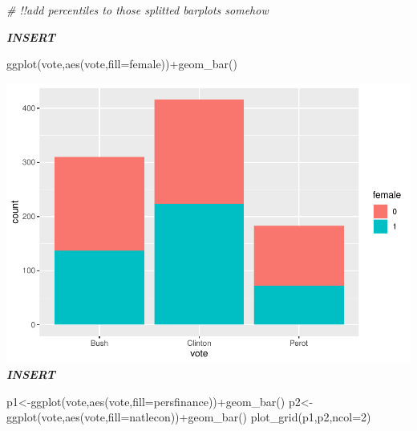\documentclass[
]{article}
\newenvironment{Shaded}{\begin{snugshade}}{\end{snugshade}}
\newcommand{\AttributeTok}[1]{\textcolor[rgb]{0.77,0.63,0.00}{#1}}
\newcommand{\CommentTok}[1]{\textcolor[rgb]{0.56,0.35,0.01}{\textit{#1}}}
\newcommand{\DecValTok}[1]{\textcolor[rgb]{0.00,0.00,0.81}{#1}}
\newcommand{\FunctionTok}[1]{\textcolor[rgb]{0.00,0.00,0.00}{#1}}
\newcommand{\NormalTok}[1]{#1}
\newcommand{\OtherTok}[1]{\textcolor[rgb]{0.56,0.35,0.01}{#1}}
\newcommand{\SpecialCharTok}[1]{\textcolor[rgb]{0.00,0.00,0.00}{#1}}
\begin{document}
\begin{Shaded}
\begin{Highlighting}[]
\CommentTok{\# !!add percentiles to those splitted barplots somehow}
\end{Highlighting}
\end{Shaded}

\textbf{\emph{INSERT}}

\begin{Shaded}
\begin{Highlighting}[]
\FunctionTok{ggplot}\NormalTok{(vote,}\FunctionTok{aes}\NormalTok{(vote,}\AttributeTok{fill=}\NormalTok{female))}\SpecialCharTok{+}\FunctionTok{geom\_bar}\NormalTok{()}
\end{Highlighting}
\end{Shaded}

\includegraphics{1992-US-election_files/figure-latex/unnamed-chunk-7-1.pdf}
\textbf{\emph{INSERT}}

\begin{Shaded}
\begin{Highlighting}[]
\NormalTok{p1}\OtherTok{\textless{}{-}}\FunctionTok{ggplot}\NormalTok{(vote,}\FunctionTok{aes}\NormalTok{(vote,}\AttributeTok{fill=}\NormalTok{persfinance))}\SpecialCharTok{+}\FunctionTok{geom\_bar}\NormalTok{()}
\NormalTok{p2}\OtherTok{\textless{}{-}}\FunctionTok{ggplot}\NormalTok{(vote,}\FunctionTok{aes}\NormalTok{(vote,}\AttributeTok{fill=}\NormalTok{natlecon))}\SpecialCharTok{+}\FunctionTok{geom\_bar}\NormalTok{()}
\FunctionTok{plot\_grid}\NormalTok{(p1,p2,}\AttributeTok{ncol=}\DecValTok{2}\NormalTok{)}
\end{Highlighting}
\end{Shaded}
\end{document}
